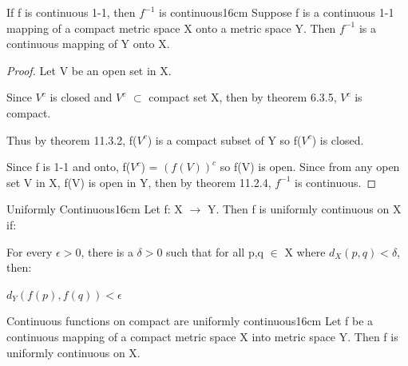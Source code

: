     \vspace{0.5cm}



    \begin{wtheorem}{If f is continuous 1-1, then $f^{-1}$ is continuous}{16cm}
        Suppose f is a continuous 1-1 mapping of a compact metric space X
        onto a metric space Y.
        Then $f^{-1}$ is a continuous mapping of Y onto X.
    \end{wtheorem}

    \begin{proof}
        Let V be an open set in X.

        Since $V^c$ is closed and $V^c$ $\subset$ compact set X,
        then by {\color{red} theorem 6.3.5}, $V^c$ is compact.

        Thus by {\color{red} theorem 11.3.2}, f($V^c$) is a compact
        subset of Y so f($V^c$) is closed.

        Since f is 1-1 and onto, f($V^c$) = $(f(V))^c$ so f(V) is open.
        Since from any open set V in X, f(V) is open in Y, then by
        {\color{red} theorem 11.2.4}, $f^{-1}$ is continuous.
    \end{proof}

    \newpage



    \begin{definition}{Uniformly Continuous}{16cm}
        Let f: X $\rightarrow$ Y. Then f is {\color{lblue} uniformly continuous}
        on X if:
        
        \begin{adjustbox}{minipage=15cm, right, vspace=0.1cm 0cm}
            For every $\epsilon > 0$, there is a $\delta > 0$
            such that for all p,q $\in$ X where $d_X(p,q) < \delta$, then:

            \hspace{0.5cm}
            $d_Y(f(p),f(q)) < \epsilon$
        \end{adjustbox}
    \end{definition}

    \vspace{0.5cm}



    \begin{wtheorem}{Continuous functions on compact are uniformly continuous}{16cm}
        Let f be a continuous mapping of a compact metric space X into
        metric space Y.
        Then f is uniformly continuous on X.
    \end{wtheorem}

